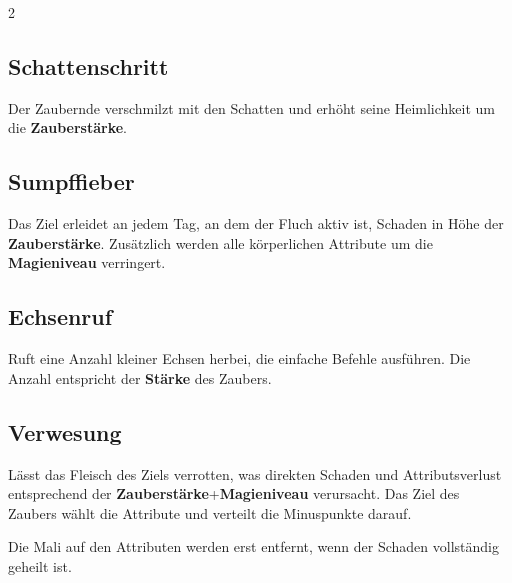 \begin{multicols*}{2}


\subsection{Schattenschritt}

Der Zaubernde verschmilzt mit den Schatten und erhöht seine Heimlichkeit um die \textbf{Zauberstärke}.



\subsection{Sumpffieber}

Das Ziel erleidet an jedem Tag, an dem der Fluch aktiv ist, Schaden in Höhe der \textbf{Zauberstärke}. Zusätzlich werden alle körperlichen Attribute um die \textbf{Magieniveau} verringert.



\subsection{Echsenruf}

Ruft eine Anzahl kleiner Echsen herbei, die einfache Befehle ausführen. Die Anzahl entspricht der \textbf{Stärke} des Zaubers.



\subsection{Verwesung}

Lässt das Fleisch des Ziels verrotten, was direkten Schaden und Attributsverlust entsprechend der \textbf{Zauberstärke}+\textbf{Magieniveau} verursacht. Das Ziel des Zaubers wählt die Attribute und verteilt die Minuspunkte darauf.

Die Mali auf den Attributen werden erst entfernt, wenn der Schaden vollständig geheilt ist.




\end{multicols*}
